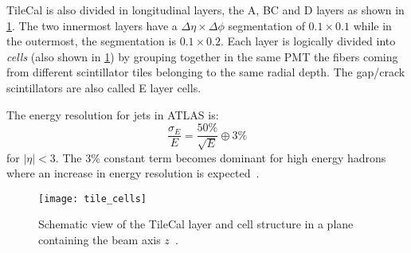TileCal is also divided in longitudinal layers, the A, BC and D layers as shown
in \cref{fig:tile_cells}. The two innermost layers have a
$\Delta \eta \times \Delta \phi$ segmentation of $0.1 \times 0.1$ while in the
outermost, the segmentation is $0.1 \times 0.2$. Each layer is logically divided
into \emph{cells} (also shown in \cref{fig:tile_cells}) by grouping together in
the same PMT the fibers coming from different scintillator tiles belonging to
the same radial depth. The gap/crack scintillators are also called E layer
cells.

The energy resolution for jets in ATLAS is:
\begin{equation}
  \label{eq:65}
  \frac{\sigma_E}{E} = \frac{50\%}{\sqrt{E}} \oplus 3\%
\end{equation}
for $|\eta| < 3$. The 3\% constant term becomes dominant for high energy hadrons
where an increase in energy resolution is expected~\cite{TileCal}.

\begin{figure}[!h]
  \centering
    \texttt{[image: tile\_cells]}
    \caption{Schematic view of the TileCal layer and cell structure in a plane
      containing the beam axis $z$~\cite{TileCalPub}.}
    \label{fig:tile_cells}
\end{figure}
